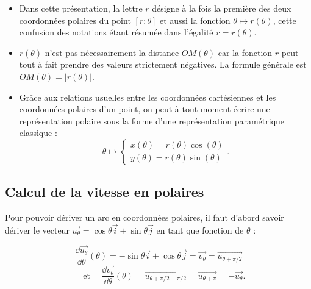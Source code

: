 \documentclass[class=report,crop=false]{standalone}
\begin{document}
\begin{remarque*}
\sauteligne
\begin{itemize}
\item Dans cette présentation, la lettre $r$ désigne à la fois la première
des deux coordonnées polaires du point $[r:\theta]$ et aussi la
fonction $\theta\mapsto r(\theta)$, cette confusion des notations
étant résumée dans l'égalité $r=r(\theta)$.

\item $r(\theta)$ n'est pas nécessairement la distance $OM(\theta)$ car la
fonction $r$ peut tout à fait prendre des valeurs strictement négatives.
La formule générale est  $OM(\theta)=|r(\theta)|$.

\item Grâce aux relations usuelles entre les coordonnées
cartésiennes et les coordonnées polaires d'un point, on peut à
tout moment écrire une représentation polaire sous la forme
d'une représentation paramétrique classique :
$$\theta\mapsto\left\{
\begin{array}{l}
x(\theta)=r(\theta)\cos(\theta)\\
y(\theta)=r(\theta)\sin(\theta)
\end{array}
\right..$$
\end{itemize}
\end{remarque*}






\subsection{Calcul de la vitesse en polaires}

Pour pouvoir dériver un arc en coordonnées polaires, il faut d'abord savoir
dériver le vecteur
$\overrightarrow{u_\theta}=\cos\theta\overrightarrow{i}+\sin\theta\overrightarrow{j}$
en tant que fonction de $\theta$ :

$$\frac{\dd\overrightarrow{u_\theta}}{\dd\theta}(\theta)
=-\sin\theta\overrightarrow{i}+\cos\theta\overrightarrow{j}
=\overrightarrow{v_\theta}=\overrightarrow{u_{\theta+\pi/2}}$$
$$
\quad\text{ et }\quad
\frac{\dd\overrightarrow{v_\theta}}{\dd\theta}(\theta)
=\overrightarrow{u_{\theta+\pi/2+\pi/2}}
=\overrightarrow{u_{\theta+\pi}}=-\overrightarrow{u_\theta}.$$
\end{document}
